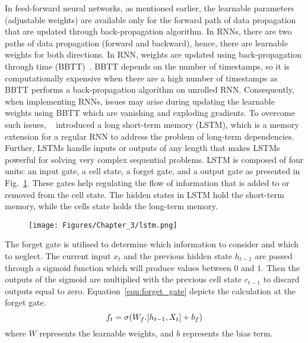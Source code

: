 In feed-forward neural networks, as mentioned earlier, the learnable parameters (adjustable weights) are available only for the forward path of data propagation that are updated through back-propagation algorithm.
In RNNs, there are two paths of data propagation (forward and backward), hence, there are learnable weights for both directions.
In RNN, weights are updated using back-propagation through time (BBTT)~\cite{Werbos1990}.
BBTT depends on the number of timestamps, so it is computationally expensive when there are a high number of timestamps as BBTT performs a back-propagation algorithm on unrolled RNN.
Consequently, when implementing RNNs, issues may arise during updating the learnable weights using BBTT which are vanishing and exploding gradients.
To overcome such issues, ~\textcite{Hochreiter1997} introduced a long short-term memory (LSTM), which is a memory extension for a regular RNN to address the problem of long-term dependencies.
Further, LSTMs handle inputs or outputs of any length that makes LSTMs powerful for solving very complex sequential problems.
LSTM is composed of four units: an input gate, a cell state, a forget gate, and a output gate as presented in Fig.~\ref{fig:lstm}.
These gates help regulating the flow of information that is added to or removed from the cell state. 
The hidden states in LSTM hold the short-term memory, while the cells state holds the long-term memory.
\begin{figure}[h!]
	\begin{center}
		\texttt{[image: Figures/Chapter\_3/lstm.png]}
	\end{center}
	\label{fig:lstm}
\end{figure}

The forget gate is utilised to determine which information to consider and which to neglect.
The current input \(x_t\) and the previous hidden state \(h_{t-1}\) are passed through a sigmoid function which will produce values between \(0\) and \(1\).
Then the outputs of the sigmoid are multiplied with the previous cell state \(c_{t-1}\) to discard outputs equal to zero.
Equation~\ref{eqn:forget_gate} depicts the calculation at the forget gate.
\begin{equation}
	\centering
	f_t = \sigma(W_f.[h_{t-1}, X_{t}]+ b_f)
	\label{eqn:forget_gate}
\end{equation}
where \(W\) represents the learnable weights, and \(b\) represents the bias term.

